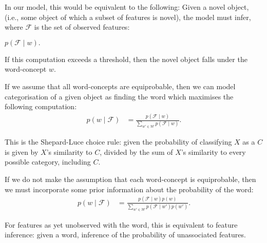 \documentclass{tufte-book}
\begin{document}
In our model, this would be equivalent to the following: Given a novel object, (i.e., some object of which a subset of features is novel), the model must infer, where $\mathcal{F}$ is the set of observed features:

\begin{center}{$p(\mathcal{F} \mid w).$}\end{center}

If this computation exceeds a threshold, then the novel object falls under the word-concept $w$.

If we assume that all word-concepts are equiprobable, then we can model categorisation of a given object as finding the word which maximises the following computation:
\begin{align*}
    p(w\mid \mathcal{F})
    &= \frac{p(\mathcal{F} \mid w)}{\sum_{w'\in\mathcal{W}}p(\mathcal{F} \mid w)}.
\end{align*}

This is the Shepard-Luce choice rule: given the probability of classifying $X$ as a $C$ is given by $X$'s similarity to $C$, divided by the sum of $X$'s similarity to every possible category, including $C$.

If we do not make the assumption that each word-concept is equiprobable, then we must incorporate some prior information about the probability of the word:
\begin{align*}
    p(w\mid \mathcal{F})
    &= \frac{p(\mathcal{F} \mid w)p(w)}{\sum_{w'\in\mathcal{W}}p(\mathcal{F} \mid w')p(w')}.
\end{align*}


For features as yet unobserved with the word, this is equivalent to feature inference: given a word, inference of the probability of unassociated features. 
\end{document}

